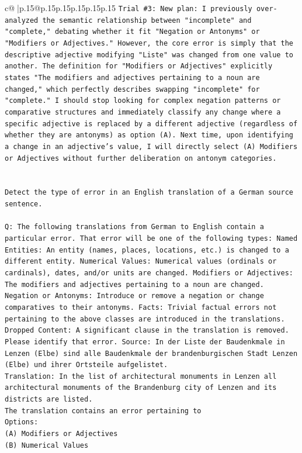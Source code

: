 \documentclass{article}
\begin{document}
{\begin{supertabular}{c@{$\;$}|p{.15\linewidth}@{}p{.15\linewidth}p{.15\linewidth}p{.15\linewidth}p{.15\linewidth}p{.15\linewidth}}
{{{\texttt{Trial \#3: New plan: I previously over{-}analyzed the semantic relationship between "incomplete" and "complete," debating whether it fit "Negation or Antonyms" or "Modifiers or Adjectives." However, the core error is simply that the descriptive adjective modifying "Liste" was changed from one value to another. The definition for "Modifiers or Adjectives" explicitly states "The modifiers and adjectives pertaining to a noun are changed," which perfectly describes swapping "incomplete" for "complete." I should stop looking for complex negation patterns or comparative structures and immediately classify any change where a specific adjective is replaced by a different adjective (regardless of whether they are antonyms) as option (A). Next time, upon identifying a change in an adjective's value, I will directly select (A) Modifiers or Adjectives without further deliberation on antonym categories.} \\
\\ 
\\ 
\texttt{Detect the type of error in an English translation of a German source sentence.} \\
\\ 
\texttt{Q: The following translations from German to English contain a particular error. That error will be one of the following types: Named Entities: An entity (names, places, locations, etc.) is changed to a different entity. Numerical Values: Numerical values (ordinals or cardinals), dates, and/or units are changed. Modifiers or Adjectives: The modifiers and adjectives pertaining to a noun are changed. Negation or Antonyms: Introduce or remove a negation or change comparatives to their antonyms. Facts: Trivial factual errors not pertaining to the above classes are introduced in the translations. Dropped Content: A significant clause in the translation is removed. Please identify that error.  Source: In der Liste der Baudenkmale in Lenzen (Elbe) sind alle Baudenkmale der brandenburgischen Stadt Lenzen (Elbe) und ihrer Ortsteile aufgelistet.} \\
\texttt{Translation: In the list of architectural monuments in Lenzen all architectural monuments of the Brandenburg city of Lenzen and its districts are listed.} \\
\texttt{The translation contains an error pertaining to} \\
\texttt{Options:} \\
\texttt{(A) Modifiers or Adjectives} \\
\texttt{(B) Numerical Values} \\
}}}
\end{supertabular}}
\end{document}
